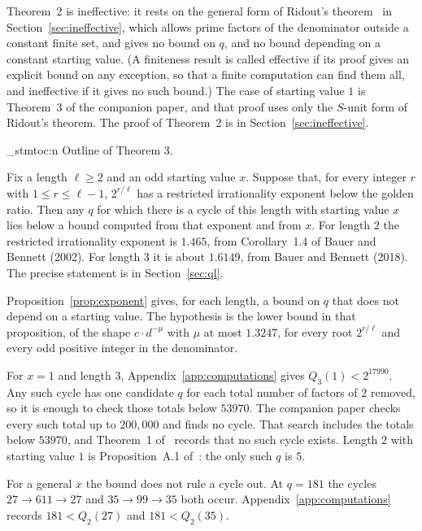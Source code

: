 \documentclass[11pt]{article}
\newenvironment{named}[1]{%
  \par\addvspace{\medskipamount}%
  \pagebreak[3]%
  \noindent{\bfseries #1}\space\ignorespaces
  \stmtoc{#1}%
}{\par\addvspace{\medskipamount}}
\newcommand{\stmtoc}[1]{ \qn_stmtoc:n {#1} }
\begin{document}
Theorem~2 is ineffective: it rests on the general form of Ridout's theorem~\cite{ridout} in Section~\ref{sec:ineffective}, which allows prime factors of the denominator outside a constant finite set, and gives no bound on $q$, and no bound depending on a constant starting value.
(A finiteness result is called effective if its proof gives an explicit bound on any exception, so that a finite computation can find them all, and ineffective if it gives no such bound.)
The case of starting value $1$ is Theorem~3 of the companion paper, and that proof uses only the $S$-unit form of Ridout's theorem.
The proof of Theorem~2 is in Section~\ref{sec:ineffective}.

\begin{named}{Outline of Theorem 3.}
Fix a length $\ell \ge 2$ and an odd starting value $x$.
Suppose that, for every integer $r$ with $1 \le r \le \ell-1$, $2^{r/\ell}$ has a restricted irrationality exponent below the golden ratio.
Then any $q$ for which there is a cycle of this length with starting value $x$ lies below a bound computed from that exponent and from $x$.
For length $2$ the restricted irrationality exponent is $1.465$, from Corollary~1.4 of Bauer and Bennett (2002).
For length $3$ it is about $1.6149$, from Bauer and Bennett (2018).
The precise statement is in Section~\ref{sec:ql}.
\end{named}

Proposition~\ref{prop:exponent} gives, for each length, a bound on $q$ that does not depend on a starting value.
The hypothesis is the lower bound in that proposition, of the shape $c \cdot d^{-\mu}$ with $\mu$ at most $1.3247$, for every root $2^{r/\ell}$ and every odd positive integer in the denominator.

For $x = 1$ and length $3$, Appendix~\ref{app:computations} gives $Q_3(1) < 2^{17990}$.
Any such cycle has one candidate $q$ for each total number of factors of $2$ removed, so it is enough to check those totals below $53970$.
The companion paper checks every such total up to $200{,}000$ and finds no cycle.
That search includes the totals below $53970$, and Theorem~1 of~\cite{hackman-i} records that no such cycle exists.
Length $2$ with starting value $1$ is Proposition~A.1 of~\cite{hackman-i}: the only such $q$ is $5$.

For a general $x$ the bound does not rule a cycle out.
At $q = 181$ the cycles $27 \to 611 \to 27$ and $35 \to 99 \to 35$ both occur.
Appendix~\ref{app:computations} records $181 < Q_2(27)$ and $181 < Q_2(35)$.
\end{document}
